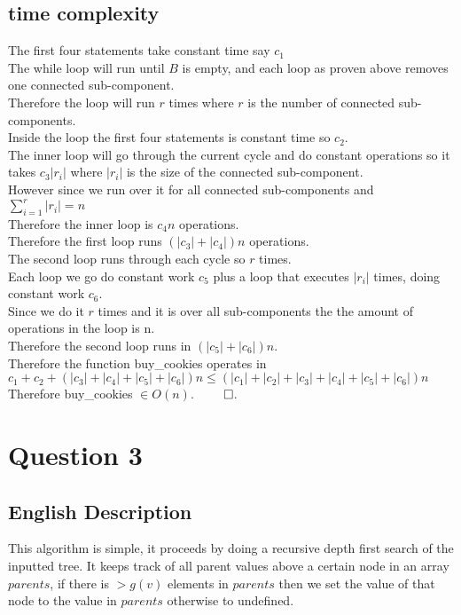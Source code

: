 \documentclass{article}
\begin{document}
    \subsection{time complexity}
      The first four statements take constant time say $c_{1}$\\
      The while loop will run until $B$ is empty, and each loop as proven above removes one connected sub-component.\\
      Therefore the loop will run $r$ times where $r$ is the number of connected sub-components.\\
      Inside the loop the first four statements is constant time so $c_{2}$.\\
      The inner loop will go through the current cycle and do constant operations so it takes $c_{3}|r_{i}|$ where $|r_{i}|$ is the size of the connected sub-component.\\
      However since we run over it for all connected sub-components and $\sum_{i = 1}^{r} |r_{i}| = n$\\
      Therefore the inner loop is $c_{4}n$ operations.\\
      Therefore the first loop runs $(|c_{3}| + |c_{4}|)n$ operations.\\
      The second loop runs through each cycle so $r$ times.\\
      Each loop we go do constant work $c_{5}$ plus a loop that executes $|r_{i}|$ times, doing constant work $c_{6}$.\\
      Since we do it $r$ times and it is over all sub-components the the amount of operations in the loop is n.\\
      Therefore the second loop runs in $(|c_{5}| + |c_{6}|)n$.\\
      Therefore the function buy\_cookies operates in $c_{1} + c_{2} + (|c_{3}| + |c_{4}| + |c_{5}| + |c_{6}|)n \leq  (|c_{1}| + |c_{2}| + |c_{3}| + |c_{4}| + |c_{5}| + |c_{6}|)n$\\
      Therefore buy\_cookies $\in O(n)$. $\qed$.\\      
  \section{Question 3}
    \subsection{English Description}
      This algorithm is simple, it proceeds by doing a recursive depth first search of the inputted tree.
      It keeps track of all parent values above a certain node in an array $parents$, if there is $> g(v)$ elements in $parents$ then we set the value of that node to the value in $parents$ otherwise to undefined.\\
\end{document}
